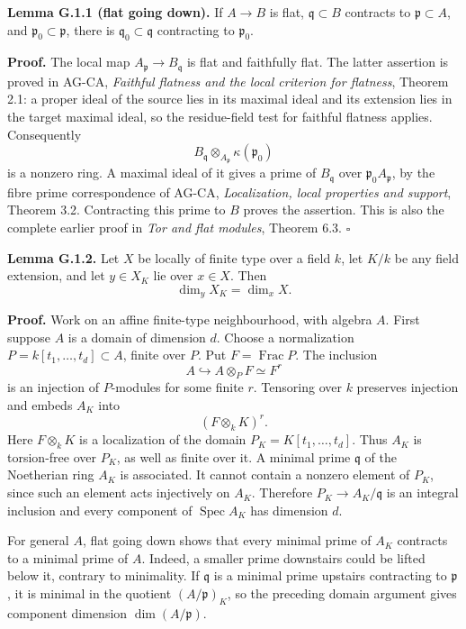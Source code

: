 \documentclass[11pt,a4paper,openany]{report}
\begin{document}
\textbf{Lemma G.1.1 (flat going down).} If \(A\to B\) is flat, \(\mathfrak q\subset B\) contracts to \(\mathfrak p\subset A\), and \(\mathfrak p_0\subset\mathfrak p\), there is \(\mathfrak q_0\subset\mathfrak q\) contracting to \(\mathfrak p_0\).

\textbf{Proof.} The local map \(A_{\mathfrak p}\to B_{\mathfrak q}\) is flat and faithfully flat. The latter assertion is proved in AG-CA, \emph{Faithful flatness and the local criterion for flatness}, Theorem 2.1: a proper ideal of the source lies in its maximal ideal and its extension lies in the target maximal ideal, so the residue-field test for faithful flatness applies. Consequently \[
B_{\mathfrak q}\otimes_{A_{\mathfrak p}}\kappa(\mathfrak p_0)
\] is a nonzero ring. A maximal ideal of it gives a prime of \(B_{\mathfrak q}\) over \(\mathfrak p_0A_{\mathfrak p}\), by the fibre prime correspondence of AG-CA, \emph{Localization, local properties and support}, Theorem 3.2. Contracting this prime to \(B\) proves the assertion. This is also the complete earlier proof in \emph{Tor and flat modules}, Theorem 6.3. \(\square\)

\textbf{Lemma G.1.2.} Let \(X\) be locally of finite type over a field \(k\), let \(K/k\) be any field extension, and let \(y\in X_K\) lie over \(x\in X\). Then \[
\dim_yX_K=\dim_xX.
\]

\textbf{Proof.} Work on an affine finite-type neighbourhood, with algebra \(A\). First suppose \(A\) is a domain of dimension \(d\). Choose a normalization \(P=k[t_1,\ldots,t_d]\subset A\), finite over \(P\). Put \(F=\operatorname{Frac}P\). The inclusion \[
A\hookrightarrow A\otimes_PF\simeq F^r
\] is an injection of \(P\)-modules for some finite \(r\). Tensoring over \(k\) preserves injection and embeds \(A_K\) into \[
(F\otimes_kK)^r.
\] Here \(F\otimes_kK\) is a localization of the domain \(P_K=K[t_1,\ldots,t_d]\). Thus \(A_K\) is torsion-free over \(P_K\), as well as finite over it. A minimal prime \(\mathfrak q\) of the Noetherian ring \(A_K\) is associated. It cannot contain a nonzero element of \(P_K\), since such an element acts injectively on \(A_K\). Therefore \(P_K\to A_K/\mathfrak q\) is an integral inclusion and every component of \(\operatorname{Spec}A_K\) has dimension \(d\).

For general \(A\), flat going down shows that every minimal prime of \(A_K\) contracts to a minimal prime of \(A\). Indeed, a smaller prime downstairs could be lifted below it, contrary to minimality. If \(\mathfrak q\) is a minimal prime upstairs contracting to \(\mathfrak p\), it is minimal in the quotient \((A/\mathfrak p)_K\), so the preceding domain argument gives component dimension \(\dim(A/\mathfrak p)\).
\end{document}
